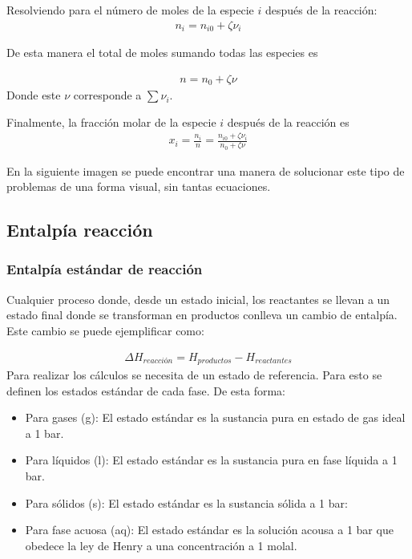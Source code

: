 Resolviendo para el número de moles de la especie $i$ después de la reacción:
\begin{align}
    n_i=n_{i0}+\zeta \nu_i
\end{align}

De esta manera el total de moles sumando todas las especies es

\begin{align}
    n=n_0 + \zeta \nu
\end{align}
Donde este $\nu$ corresponde a $\sum \nu_i$. 

Finalmente, la fracción molar de la especie $i$ después de la reacción es 
\begin{align}
    x_i=\frac{n_i}{n}=\frac{n_{i0}+\zeta \nu_i}{n_0 + \zeta \nu}
\end{align}

En la siguiente imagen se puede encontrar una manera de solucionar este tipo de problemas de una forma visual, sin tantas ecuaciones.


\subsection{Entalpía reacción}
\subsubsection{Entalpía estándar de reacción}

Cualquier proceso donde, desde un estado inicial, los reactantes se llevan a un estado final donde se transforman
en productos conlleva un cambio de entalpía. Este cambio se puede ejemplificar como:

\begin{align}
    \Delta H_{reacción}=H_{productos}-H_{reactantes}
\end{align}
Para realizar los cálculos se necesita de un estado de referencia. Para esto se definen los estados estándar de cada fase. De esta forma:

\begin{itemize}
    \item Para gases (g): El estado estándar es la sustancia pura en estado de gas ideal a 1 bar.
    \item Para líquidos (l): El estado estándar es la sustancia pura en fase líquida a 1 bar.
    \item Para sólidos (s): El estado estándar es la sustancia sólida a 1 bar:
    \item Para fase acuosa (aq): El estado estándar es la solución acousa a 1 bar que obedece la ley de Henry a una concentración a 1 molal.
\end{itemize}

